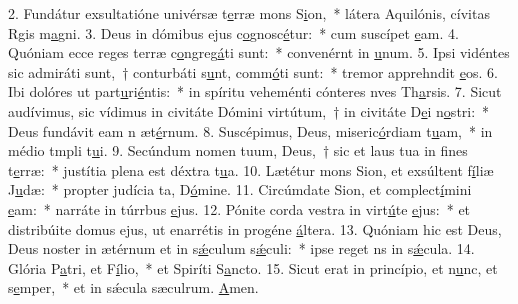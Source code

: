 2. Fundátur exsultatióne univérsæ t\uline{e}rræ mons S\uline{i}on,~* látera Aquilónis, cívitas Rgis m\uline{a}gni.
3. Deus in dómibus ejus c\uline{o}gnosc\uline{é}tur:~* cum suscípet \uline{e}am.
4. Quóniam ecce reges terræ c\uline{o}ngreg\uline{á}ti sunt:~* convenérnt in \uline{u}num.
5. Ipsi vidéntes sic admiráti sunt,~† conturbáti s\uline{u}nt, comm\uline{ó}ti sunt:~* tremor apprehndit \uline{e}os.
6. Ibi dolóres ut part\uline{u}ri\uline{é}ntis:~* in spíritu veheménti cónteres nves Th\uline{a}rsis.
7. Sicut audívimus, sic vídimus in civitáte Dómini virtútum,~† in civitáte D\uline{e}i n\uline{o}stri:~* Deus fundávit eam n æt\uline{é}rnum.
8. Suscépimus, Deus, miseric\uline{ó}rdiam t\uline{u}am,~* in médio tmpli t\uline{u}i.
9. Secúndum nomen tuum, Deus,~† sic et laus tua in f\uline{i}nes t\uline{e}rræ:~* justítia plena est déxtra t\uline{u}a.
10. Lætétur mons Sion, et exsúltent f\uline{í}liæ J\uline{u}dæ:~* propter judícia ta, D\uline{ó}mine.
11. Circúmdate Sion, et complect\uline{í}mini \uline{e}am:~* narráte in túrrbus \uline{e}jus.
12. Pónite corda vestra in virt\uline{ú}te \uline{e}jus:~* et distribúite domus ejus, ut enarrétis in progéne \uline{á}ltera.
13. Quóniam hic est Deus, Deus noster in ætérnum et in s\uline{ǽ}culum s\uline{ǽ}culi:~* ipse reget ns in s\uline{ǽ}cula.
14. Glória P\uline{a}tri, et F\uline{í}lio,~* et Spiríti S\uline{a}ncto.
15. Sicut erat in princípio, et n\uline{u}nc, et s\uline{e}mper,~* et in sǽcula sæculrum. \uline{A}men.
